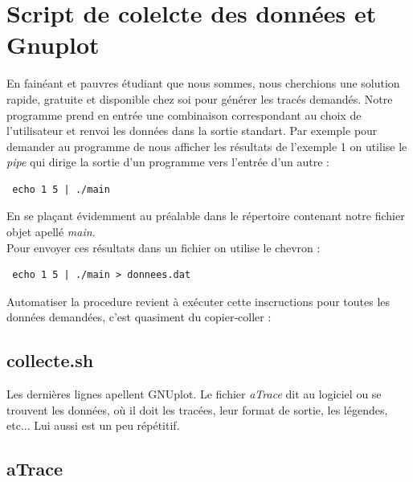 \documentclass[a4paper,11pt]{article}
\begin{document}
  \section{Script de colelcte des données et Gnuplot}
    En fainéant et pauvres étudiant que nous sommes, nous cherchions une solution rapide, gratuite et disponible chez soi pour générer les tracés 
demandés. Notre programme prend en entrée une combinaison correspondant au choix de l'utilisateur et renvoi les données dans la sortie standart.
Par exemple pour demander au programme de nous afficher les résultats de l'exemple 1 on utilise le \textit{pipe} qui dirige la sortie d'un programme 
vers l'entrée d'un autre :

\begin{lstlisting}
 echo 1 5 | ./main
\end{lstlisting}

En se plaçant évidemment au préalable dans le répertoire contenant notre fichier objet apellé \textit{main}.\\
Pour envoyer ces résultats dans un fichier on utilise le chevron :

\begin{lstlisting}
 echo 1 5 | ./main > donnees.dat
\end{lstlisting}

Automatiser la procedure revient à exécuter cette inscructions pour toutes les données demandées, c'est quasiment du copier-coller :

  \subsection{collecte.sh}
%    

Les dernières lignes apellent GNUplot. Le fichier \textit{aTrace} dit au logiciel ou se trouvent les données, où il doit les tracées,
leur format de sortie, les légendes, etc... Lui aussi est un peu répétitif.


  \subsection{aTrace}
    
\end{document}
